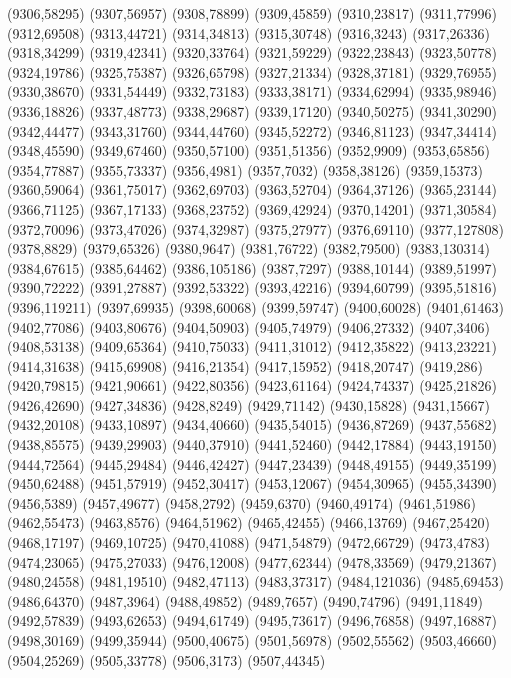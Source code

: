 (9306,58295)
(9307,56957)
(9308,78899)
(9309,45859)
(9310,23817)
(9311,77996)
(9312,69508)
(9313,44721)
(9314,34813)
(9315,30748)
(9316,3243)
(9317,26336)
(9318,34299)
(9319,42341)
(9320,33764)
(9321,59229)
(9322,23843)
(9323,50778)
(9324,19786)
(9325,75387)
(9326,65798)
(9327,21334)
(9328,37181)
(9329,76955)
(9330,38670)
(9331,54449)
(9332,73183)
(9333,38171)
(9334,62994)
(9335,98946)
(9336,18826)
(9337,48773)
(9338,29687)
(9339,17120)
(9340,50275)
(9341,30290)
(9342,44477)
(9343,31760)
(9344,44760)
(9345,52272)
(9346,81123)
(9347,34414)
(9348,45590)
(9349,67460)
(9350,57100)
(9351,51356)
(9352,9909)
(9353,65856)
(9354,77887)
(9355,73337)
(9356,4981)
(9357,7032)
(9358,38126)
(9359,15373)
(9360,59064)
(9361,75017)
(9362,69703)
(9363,52704)
(9364,37126)
(9365,23144)
(9366,71125)
(9367,17133)
(9368,23752)
(9369,42924)
(9370,14201)
(9371,30584)
(9372,70096)
(9373,47026)
(9374,32987)
(9375,27977)
(9376,69110)
(9377,127808)
(9378,8829)
(9379,65326)
(9380,9647)
(9381,76722)
(9382,79500)
(9383,130314)
(9384,67615)
(9385,64462)
(9386,105186)
(9387,7297)
(9388,10144)
(9389,51997)
(9390,72222)
(9391,27887)
(9392,53322)
(9393,42216)
(9394,60799)
(9395,51816)
(9396,119211)
(9397,69935)
(9398,60068)
(9399,59747)
(9400,60028)
(9401,61463)
(9402,77086)
(9403,80676)
(9404,50903)
(9405,74979)
(9406,27332)
(9407,3406)
(9408,53138)
(9409,65364)
(9410,75033)
(9411,31012)
(9412,35822)
(9413,23221)
(9414,31638)
(9415,69908)
(9416,21354)
(9417,15952)
(9418,20747)
(9419,286)
(9420,79815)
(9421,90661)
(9422,80356)
(9423,61164)
(9424,74337)
(9425,21826)
(9426,42690)
(9427,34836)
(9428,8249)
(9429,71142)
(9430,15828)
(9431,15667)
(9432,20108)
(9433,10897)
(9434,40660)
(9435,54015)
(9436,87269)
(9437,55682)
(9438,85575)
(9439,29903)
(9440,37910)
(9441,52460)
(9442,17884)
(9443,19150)
(9444,72564)
(9445,29484)
(9446,42427)
(9447,23439)
(9448,49155)
(9449,35199)
(9450,62488)
(9451,57919)
(9452,30417)
(9453,12067)
(9454,30965)
(9455,34390)
(9456,5389)
(9457,49677)
(9458,2792)
(9459,6370)
(9460,49174)
(9461,51986)
(9462,55473)
(9463,8576)
(9464,51962)
(9465,42455)
(9466,13769)
(9467,25420)
(9468,17197)
(9469,10725)
(9470,41088)
(9471,54879)
(9472,66729)
(9473,4783)
(9474,23065)
(9475,27033)
(9476,12008)
(9477,62344)
(9478,33569)
(9479,21367)
(9480,24558)
(9481,19510)
(9482,47113)
(9483,37317)
(9484,121036)
(9485,69453)
(9486,64370)
(9487,3964)
(9488,49852)
(9489,7657)
(9490,74796)
(9491,11849)
(9492,57839)
(9493,62653)
(9494,61749)
(9495,73617)
(9496,76858)
(9497,16887)
(9498,30169)
(9499,35944)
(9500,40675)
(9501,56978)
(9502,55562)
(9503,46660)
(9504,25269)
(9505,33778)
(9506,3173)
(9507,44345)
